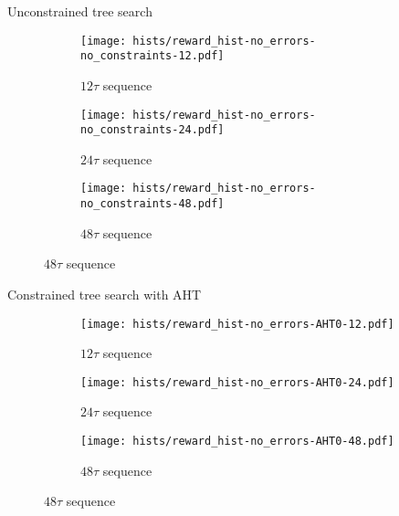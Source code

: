 \documentclass{beamer}
\begin{document}
\begin{frame}{Unconstrained tree search}
%
\begin{figure}[H]
    \centering
    \begin{subfigure}{.49\textwidth}
        \centering
        \texttt{[image: hists/reward\_hist-no\_errors-no\_constraints-12.pdf]}
        \caption{$12\tau$ sequence}
        \label{fig:reward_hist-no_errors-no_constraints-12}
    \end{subfigure}
    \begin{subfigure}{.49\textwidth}
        \centering
        \texttt{[image: hists/reward\_hist-no\_errors-no\_constraints-24.pdf]}
        \caption{$24\tau$ sequence}
        \label{fig:reward_hist-no_errors-no_constraints-24}
    \end{subfigure}
    \begin{subfigure}{.49\textwidth}
        \centering
        \texttt{[image: hists/reward\_hist-no\_errors-no\_constraints-48.pdf]}
        \caption{$48\tau$ sequence}
        \label{fig:reward_hist-no_errors-no_constraints-48}
    \end{subfigure}
\end{figure}


\end{frame}



\begin{frame}{Constrained tree search with AHT}
%
\begin{figure}[H]
    \centering
    \begin{subfigure}{.49\textwidth}
        \centering
        \texttt{[image: hists/reward\_hist-no\_errors-AHT0-12.pdf]}
        \caption{$12\tau$ sequence}
        \label{fig:reward_hist-no_errors-AHT0-12}
    \end{subfigure}
    \begin{subfigure}{.49\textwidth}
        \centering
        \texttt{[image: hists/reward\_hist-no\_errors-AHT0-24.pdf]}
        \caption{$24\tau$ sequence}
        \label{fig:reward_hist-no_errors-AHT0-24}
    \end{subfigure}
    \begin{subfigure}{.49\textwidth}
        \centering
        \texttt{[image: hists/reward\_hist-no\_errors-AHT0-48.pdf]}
        \caption{$48\tau$ sequence}
        \label{fig:reward_hist-no_errors-AHT0-48}
    \end{subfigure}
\end{figure}


\end{frame}
\end{document}
